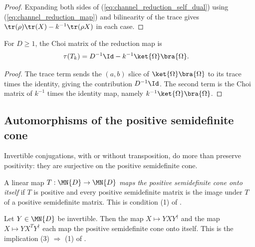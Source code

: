 \begin{proof}\leanok
    Expanding both sides of (\ref{eq:channel_reduction_self_dual}) using
    (\ref{eq:channel_reduction_map}) and bilinearity of the trace gives
    $\tr(\rho)\tr(X)-k^{-1}\tr(\rho X)$ in each case.
\end{proof}

\begin{theorem}
    \label{thm:choi_matrix_reduction_map}
    \leanok
    For $D\ge 1$, the Choi matrix of the reduction map is
    \begin{align}
        \tau(T_k)
         & =D^{-1}\Id-k^{-1}\ket{\Omega}\bra{\Omega}.
        \label{eq:channel_reduction_choi}
    \end{align}
\end{theorem}

\begin{proof}\leanok
    The trace term sends the $(a,b)$ slice of
    $\ket{\Omega}\bra{\Omega}$ to its trace times the identity, giving
    the contribution $D^{-1}\Id$. The second term is the Choi matrix of
    $k^{-1}$ times the identity map, namely
    $k^{-1}\ket{\Omega}\bra{\Omega}$.
\end{proof}

\subsection{Automorphisms of the positive semidefinite cone}

Invertible conjugations, with or without transposition, do more than preserve
positivity: they are surjective on the positive semidefinite cone.

\begin{definition}
    \label{def:maps_psd_cone_onto}
    \leanok
    A linear map $T:\MN{D}\to\MN{D}$ \emph{maps the positive semidefinite cone
        onto itself} if $T$ is positive and every positive semidefinite matrix is
    the image under $T$ of a positive semidefinite matrix. This is condition
    (1) of \cite[Proposition~3.6]{Wolf2012Quantum}.
\end{definition}

\begin{theorem}
    \label{thm:conjugation_maps_psd_cone_onto}
    \leanok
    Let $Y\in\MN{D}$ be invertible. Then the map $X\mapsto YXY^\dagger$ and the
    map $X\mapsto YX^TY^\dagger$ each map the positive semidefinite cone onto
    itself. This is the implication (3) $\Rightarrow$ (1) of
    \cite[Proposition~3.6]{Wolf2012Quantum}.
\end{theorem}

